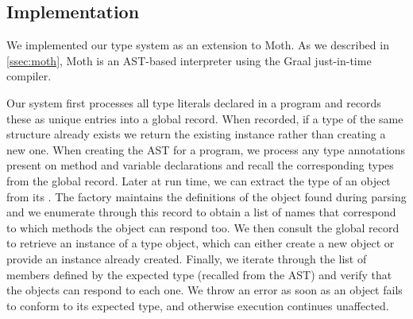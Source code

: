 \subsection{Implementation} 
\label{sec:implementation} 


We implemented our type system as an extension to Moth.
As we described in \cref{ssec:moth},
Moth is an AST-based interpreter
using the Graal just-in-time compiler\citep{Wurthinger:2017:PPE}.


Our system first processes all type literals declared in a program and records these as
unique entries into a global record.
When recorded, if a type of the same structure already exists we return the existing instance
rather than creating a new one.
When creating the AST for a program, 
we process any type annotations present on method and variable declarations and
recall the corresponding types from the global record. 
Later at run time, we can extract the type of an object from its .
The factory maintains the definitions of the object found during parsing and
we enumerate through this record to obtain a list of names that correspond
to which methods the object can respond too.
We then consult the global record to retrieve an instance of a type object,
which can either create a new object or provide an instance already created.
Finally, we iterate through the list of members defined by the expected type 
(recalled from the AST) and verify that the objects can respond to each one.
We throw an error as soon as an object fails to conform to its expected type, 
and otherwise execution continues unaffected.

